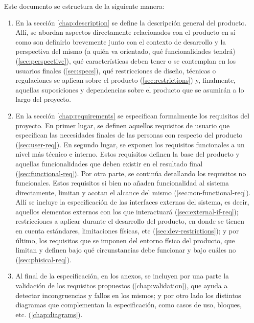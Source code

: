Este documento se estructura de la siguiente manera:

\begin{enumerate}
  \item En la sección \ref{chap:description} se define la descripción general del
        producto. Allí, se abordan aspectos directamente relacionados con el producto en sí
        como son definirlo brevemente junto con el contexto de desarrollo y
        la perspectiva del mismo (a quién va orientado, qué funcionalidades tendrá)
        (\ref{sec:perspective}), qué características deben tener o se contemplan en
        los usuarios finales (\ref{sec:specs}), qué restricciones de diseño, técnicas
        o regulaciones se aplican sobre el producto (\ref{sec:restrictions}) y,
        finalmente, aquellas suposiciones y dependencias sobre el producto que se
        asumirán a lo largo del proyecto.
  \item En la sección \ref{chap:requirements} se especifican formalmente los
        requisitos del proyecto. En primer lugar, se definen aquellos requisitos
        de usuario que especifican las necesidades finales de las personas con respecto
        del producto (\ref{sec:user-req}). En segundo lugar, se exponen los requisitos
        funcionales a un nivel más técnico e interno. Estos requisitos definen la
        base del producto y aquellas funcionalidades que deben existir en el resultado
        final (\ref{sec:functional-req}). Por otra parte, se continúa detallando
        los requisitos no funcionales. Estos requisitos si bien no añaden funcionalidad
        al sistema directamente, limitan y acotan el alcance del mismo (\ref{sec:non-functional-req}).
        Allí se incluye la especificación de las interfaces externas
        del sistema, es decir, aquellos elementos externos con los que interactuará
        (\ref{sec:external-if-req}); restricciones a aplicar durante el desarrollo del
        producto, en donde se tienen en cuenta estándares, limitaciones físicas, etc
        (\ref{sec:dev-restrictions}); y por último, los requisitos que se imponen del
        entorno físico del producto, que limitan y definen bajo qué circunstancias
        debe funcionar y bajo cuáles no (\ref{sec:phisical-req}).
  \item Al final de la especificación, en los anexos, se incluyen por una parte
        la validación de los requisitos propuestos (\ref{chap:validation}), que 
        ayuda a detectar incongruencias y fallos en los mismos; y por otro lado
        los distintos diagramas que complementan la especificación,
        como casos de uso, bloques, etc. (\ref{chap:diagrams}).
\end{enumerate}